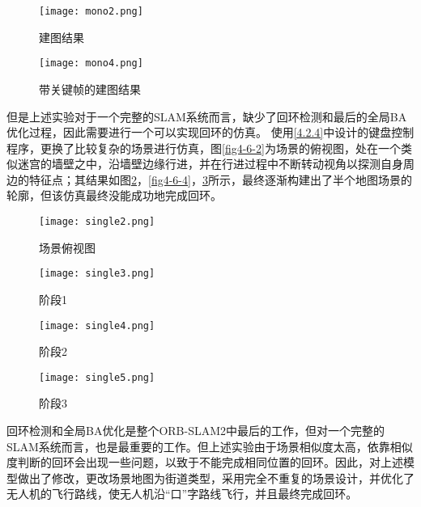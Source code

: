 \begin{figure}[htbp]
	\centering
	\begin{minipage}[t]{0.45\columnwidth} %
		\centering
		\texttt{[image: mono2.png]}
		\caption{建图结果}
		\label{fig-mono3}
	\end{minipage}
	\begin{minipage}[t]{0.45\columnwidth}
		\centering
		\texttt{[image: mono4.png]}
		\caption{带关键帧的建图结果}
		\label{fig-mono4}
	\end{minipage}
\end{figure}

但是上述实验对于一个完整的SLAM系统而言，缺少了回环检测和最后的全局BA优化过程，因此需要进行一个可以实现回环的仿真。
使用\ref{4.2.4}中设计的键盘控制程序，更换了比较复杂的场景进行仿真，图\ref{fig4-6-2}为场景的俯视图，处在一个类似迷宫的墙壁之中，沿墙壁边缘行进，并在行进过程中不断转动视角以探测自身周边的特征点；其结果如图\ref{fig4-6-3}，\ref{fig4-6-4}，\ref{fig4-6-5}所示，最终逐渐构建出了半个地图场景的轮廓，但该仿真最终没能成功地完成回环。

\begin{figure}[htbp]
	\centering
	\begin{minipage}[t]{0.45\columnwidth} %
		\centering
		\texttt{[image: single2.png]}
		\caption{场景俯视图}
		\label{fig4-6-2}
	\end{minipage}
	\begin{minipage}[t]{0.45\columnwidth}
		\centering
		\texttt{[image: single3.png]}
		\caption{阶段1}
		\label{fig4-6-3}
	\end{minipage}
\end{figure}

\begin{figure}[htbp]
	\centering
	\begin{minipage}[t]{0.45\columnwidth}
		\centering
		\texttt{[image: single4.png]}
		\caption{阶段2}
		\label{fig4-6-4}
	\end{minipage}
	\begin{minipage}[t]{0.45\columnwidth}
		\centering
		\texttt{[image: single5.png]}
		\caption{阶段3}
		\label{fig4-6-5}
	\end{minipage}
\end{figure}

回环检测和全局BA优化是整个ORB-SLAM2中最后的工作，但对一个完整的SLAM系统而言，也是最重要的工作。但上述实验由于场景相似度太高，依靠相似度判断的回环会出现一些问题，以致于不能完成相同位置的回环。因此，对上述模型做出了修改，更改场景地图为街道类型，采用完全不重复的场景设计，并优化了无人机的飞行路线，使无人机沿“口”字路线飞行，并且最终完成回环。

